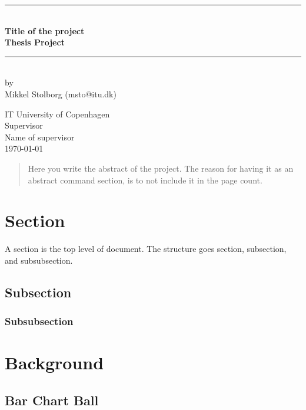 \documentclass[a4paper,11pt]{article}
\begin{document}
\lstset{language=C}  

\begin{titlepage}
\centering \parindent=0pt
\newcommand{\HRule}{\rule{\textwidth}{1mm}}
 \HRule\\[1cm]\large\bfseries
Title of the project\\[0.7cm]
\large Thesis Project\\[1cm]
\HRule\\[1cm]


\large by 
\\Mikkel Stolborg (msto@itu.dk)
 \normalsize
\begin{flushleft}
IT University of Copenhagen \\
Supervisor\\
Name of supervisor\\
\today \end{flushleft}
\end{titlepage}

\begin{abstract}
Here you write the abstract of the project. The reason for having it as an abstract command section, is to not include it in the page count.
\end{abstract}
\pagebreak
\tableofcontents
\pagebreak
\section{Section}
A section is the top level of document. The structure goes section, subsection, and subsubsection.
\subsection{Subsection}
\subsubsection{Subsubsection}
\section{Background}
\subsection{Bar Chart Ball}
\label{back:barchartball}
\end{document}
